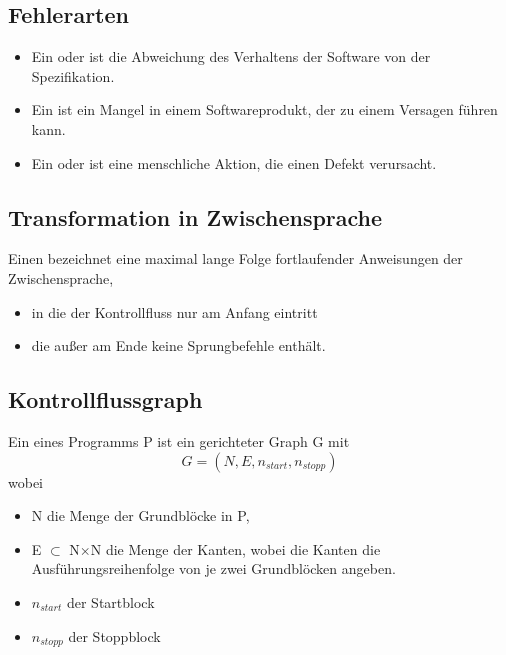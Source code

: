 \subsection{Fehlerarten}
\begin{itemize}
    \item Ein  oder  ist die Abweichung des Verhaltens der Software von der Spezifikation.
    \item Ein  ist ein Mangel in einem Softwareprodukt, der zu einem Versagen führen kann.
    \item Ein  oder  ist eine menschliche Aktion, die einen Defekt verursacht.
\end{itemize}

\subsection{Transformation in Zwischensprache}

Einen  bezeichnet eine maximal lange Folge fortlaufender Anweisungen der Zwischensprache,
\begin{itemize}
    \item in die der Kontrollfluss nur am Anfang eintritt
    \item die außer am Ende keine Sprungbefehle enthält.
\end{itemize}

\newpage

\subsection{Kontrollflussgraph}
Ein  eines Programms P ist ein gerichteter Graph G mit 
\[G=(N,E,n_{start},n_{stopp})\]
wobei
\begin{itemize}
    \item N die Menge der Grundblöcke in P,
    \item E $\subset$ N$\times$N die Menge der Kanten, wobei die Kanten die Ausführungsreihenfolge von je zwei Grundblöcken angeben.
    \item $n_{start}$ der Startblock
    \item $n_{stopp}$ der Stoppblock
\end{itemize}

\newpage

